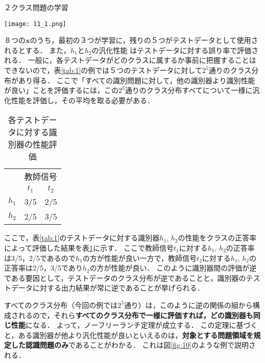 \documentclass[dvipdfmx]{jreport}
\begin{document}
\begin{table}[h]
    \begin{center}
        \caption{２クラス問題の学習}\label{tab:1}
        \texttt{[image: 11\_1.png]}
    \end{center}
\end{table}

８つの$\bm{x}$のうち，最初の３つが学習に，残りの５つがテストデータとして使用されるとする．
また，$h_1$と$h_2$の汎化性能
はテストデータに対する誤り率で評価される．
一般に，各テストデータがどのクラスに属するか事前に把握することはできないので，表\ref{tab:1}の例では５つのテストデータに対して$2^5$通りのクラス分布があり得る．
ここで「すべての識別問題に対して，他の識別器より識別性能が良い」ことを評価するには，この$2^5$通りのクラス分布すべてについて一様に汎化性能を評価し，その平均を取る必要がある．

\begin{table}[h]
    \begin{center}
        \caption{各テストデータに対する識別器の性能評価}\label{tab:2}
        \begin{tabular}{|l||c|c|} \hline
            & \multicolumn{2}{|c|}{教師信号} \\ \cline{2-3}
            & $t_1$ & $t_2$ \\ \hline
            $h_1$ & 3/5 & 2/5 \\
            $h_2$ & 2/5 & 3/5 \\ \hline
        \end{tabular}
    \end{center}
\end{table}

\newpage
ここで，表\ref{tab:1}のテストデータに対する識別器$h_1$, $h_2$の性能をクラスの正答率によって評価した結果を表\ref{tab:2}に示す．
ここで教師信号$t_1$に対する$h_1$, $h_2$の正答率は3/5，2/5であるので$h_1$の方が性能が良い一方で，教師信号$t_2$に対する$h_1$, $h_2$の正答率は2/5，3/5であり$h_2$の方が性能が良い．
このように識別器間の評価が逆である要因として，テストデータのクラス分布が逆であることと，識別器のテストデータに対する出力結果が常に逆であることが挙げられる．

すべてのクラス分布（今回の例では$2^5$通り）は，このように逆の関係の組から構成されるので，それら\textbf{すべてのクラス分布で一様に評価すれば，どの識別器も同じ性能}になる．
よって，ノーフリーランチ定理が成立する．
この定理に基づくと，ある識別器が他より汎化性能が良いといえるのは，\textbf{対象とする問題領域を規定した認識問題のみ}であることがわかる．
これは図\ref{fig:10}のような例で説明される．
\end{document}

